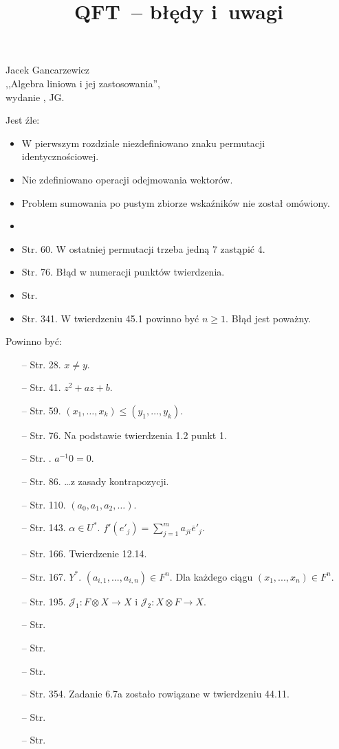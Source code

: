 \documentclass[a4paper,11pt]{article}
\title{QFT~-- błędy i~uwagi}
\begin{document}





\begin{center}
Jacek Gancarzewicz\\
,,Algebra liniowa i jej zastosowania'',\\ wydanie , JG.
\end{center}
Jest źle:
\begin{itemize}
\item W pierwszym rozdziale niezdefiniowano znaku permutacji \\identycznościowej.
\item Nie zdefiniowano operacji odejmowania wektorów.
\item Problem sumowania po pustym zbiorze wskaźników nie został omówiony.
\item
\item Str. 60. W ostatniej permutacji trzeba jedną 7 zastąpić 4.
\item Str. 76. Błąd w numeracji punktów twierdzenia.
\item Str.
\item Str. 341. W twierdzeniu 45.1 powinno być $n \geq 1$. Błąd jest poważny.
\end{itemize}
Powinno być:
\begin{itemize}
\item[--] Str. 28. $x\neq y$.
\item[--] Str. 41. $z^2+az+b$.
\item[--] Str. 59. $(x_{1},\ldots,x_{k})\leq (y_{1},\ldots,y_{k})$.
\item[--] Str. 76. Na podstawie twierdzenia 1.2 punkt 1.
\item[--] Str. . $a^{-1} 0=0$.
\item[--] Str. 86. \ldots z zasady kontrapozycji.
\item[--] Str. 110. $(a_{0},a_{1},a_{2},\ldots)$.
\item[--] Str. 143. $\alpha\in U^{*}$. $f'(e'_{j})=\sum_{j=1}^{m}a_{ji}\overset{\_}{e}'_{j}$.
\item[--] Str. 166. Twierdzenie 12.14.
\item[--] Str. 167. $Y^{*}$. $(a_{i,1},...,a_{i,n})\in F^{n}$. Dla każdego ciągu $(x_{1},...,x_{n})\in F^{n}$.
\item[--] Str. 195. $\mathcal{J}_{1}: F\otimes X\rightarrow X$ i $\mathcal{J}_{2}: X\otimes F\rightarrow X$.
\item[--] Str.
\item[--] Str.
\item[--] Str.
\item[--] Str. 354. Zadanie \romannumeral6.7a  zostało rowiązane w twierdzeniu 44.11.
\item[--] Str.
\item[--] Str.
\end{itemize}
\end{document}
